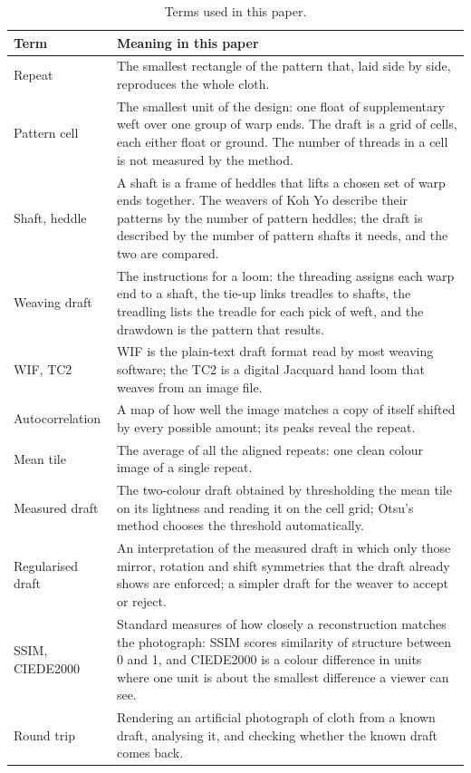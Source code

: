 \documentclass[12pt]{article}
\begin{document}
\begin{table}[htbp]
\caption{Terms used in this paper.}
\label{tab:terms}
\small
\renewcommand{\arraystretch}{1.1}
\begin{tabular}{L{3.2cm}L{11.3cm}}
Term & Meaning in this paper \\ \midrule
Repeat & The smallest rectangle of the pattern that, laid side by side, reproduces the whole cloth. \\
Pattern cell & The smallest unit of the design: one float of supplementary weft over one group of warp ends. The draft is a grid of cells, each either float or ground. The number of threads in a cell is not measured by the method. \\
Shaft, heddle & A shaft is a frame of heddles that lifts a chosen set of warp ends together. The weavers of Koh Yo describe their patterns by the number of pattern heddles; the draft is described by the number of pattern shafts it needs, and the two are compared. \\
Weaving draft & The instructions for a loom: the threading assigns each warp end to a shaft, the tie-up links treadles to shafts, the treadling lists the treadle for each pick of weft, and the drawdown is the pattern that results. \\
WIF, TC2 & WIF is the plain-text draft format read by most weaving software; the TC2 is a digital Jacquard hand loom that weaves from an image file. \\
Autocorrelation & A map of how well the image matches a copy of itself shifted by every possible amount; its peaks reveal the repeat. \\
Mean tile & The average of all the aligned repeats: one clean colour image of a single repeat. \\
Measured draft & The two-colour draft obtained by thresholding the mean tile on its lightness and reading it on the cell grid; Otsu's method chooses the threshold automatically. \\
Regularised draft & An interpretation of the measured draft in which only those mirror, rotation and shift symmetries that the draft already shows are enforced; a simpler draft for the weaver to accept or reject. \\
SSIM, CIEDE2000 & Standard measures of how closely a reconstruction matches the photograph: SSIM scores similarity of structure between 0 and 1, and CIEDE2000 is a colour difference in units where one unit is about the smallest difference a viewer can see. \\
Round trip & Rendering an artificial photograph of cloth from a known draft, analysing it, and checking whether the known draft comes back. \\
\end{tabular}
\end{table}
\end{document}
